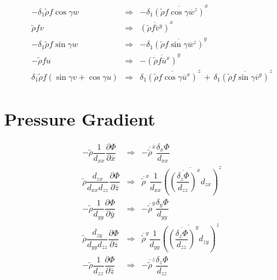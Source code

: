 \begin{eqnarray}
 - \delta _{1} \tilde{\rho} f \cos\gamma w & \Longrightarrow &
 - \delta _{1} \overline{ \left(\tilde{\rho} f \cos\gamma \overline{
 w}^{z}\right)}^{x}
 \\
 \tilde{\rho} f  v  & \Longrightarrow & \overline{ \left(\tilde{\rho} f
  \overline{ v  }^{y} \right)}^{x} \\
-\delta _{1}\tilde{\rho} f \sin\gamma w & \Longrightarrow &
-\delta _{1} \overline{ \left(\tilde{\rho} f \sin\gamma \overline{
 w}^{z}\right)}^{y} \\
 -   \tilde{\rho} f  u  & \Longrightarrow &
 - \overline{ \left(  \tilde{\rho} f \overline{  u }^{x}\right)}^{y} \\
\delta _{1}\tilde{\rho} f(\sin\gamma  v  + \cos\gamma  u )
 & \Longrightarrow & \delta _{1} \overline{ \left(\tilde{\rho} f
 \cos\gamma  \overline{   u  }^{x}\right)}^{z }\, + \, \delta _{1} \overline{ \left(\tilde{\rho} f
 \sin\gamma  \overline{   v  }^{y}\right)}^{z }
  \end{eqnarray}

\section{Pressure Gradient}
\begin{eqnarray}
- \tilde{\rho}\dfrac{1}{d_{xx}}
\dfrac{\partial \Phi}{\partial \overline{x}}
 & \Longrightarrow & -  \overline{  \tilde{\rho}}^{x}\dfrac{\delta_{x} \Phi}{d_{xx}}
 \\
\tilde{\rho}\dfrac{d_{zx}}{d_{xx}d_{zz}}
\dfrac{\partial \Phi}{\partial \overline{z}}
 & \Longrightarrow &   \overline{ \tilde{\rho}}^{x} \dfrac{1}{d_{xx}}
\overline{ \left(\overline{ \left(\dfrac{\delta_{z} \Phi}{d_{zz}} \right)}^{x}d_{zx}\right)}^{z}\\
- \tilde{\rho}\dfrac{1}{d_{yy}}
\dfrac{\partial \Phi}{\partial \overline{y}}
 & \Longrightarrow & -   \overline{  \tilde{\rho}}^{y}
 \dfrac{\delta_{y} \Phi}{d_{yy}}
 \\
   \tilde{\rho}\dfrac{d_{zy}}{d_{yy}d_{zz}}
\dfrac{\partial \Phi}{\partial \overline{z}}
 & \Longrightarrow &  \overline{ \tilde{\rho}}^{y} \dfrac{1}{d_{yy}}
\overline{ \left(\overline{ \left(\dfrac{\delta_{z} \Phi}{d_{zz}}
\right)}^{y}d_{zy}\right)}^{z}\\
  -  \tilde{\rho}\dfrac{1}{d_{zz}}
  \dfrac{\partial \Phi}{\partial \overline{z}}
 & \Longrightarrow & - \overline{ \tilde{\rho}}^{z}  \dfrac{\delta_{z}
 \Phi}{d_{zz}}
   \end{eqnarray}

